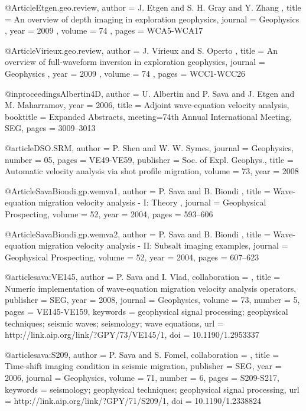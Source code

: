 {@Article{Etgen.geo.review,
 author =  { J. Etgen and  S. H. Gray and Y. Zhang },
 title =   { An overview of depth imaging in exploration geophysics},
 journal = { Geophysics },
 year =    { 2009 },
 volume =  { 74 },
 pages =   { WCA5-WCA17 }
}

@Article{Virieux.geo.review,
 author =  { J. Virieux and S. Operto },
 title =   { An overview of full-waveform inversion in exploration geophysics},
 journal = { Geophysics },
 year =    { 2009 },
 volume =  { 74 },
 pages =   { WCC1-WCC26 }
}


@inproceedings{Albertin4D,
  author = {U. Albertin and P. Sava and J. Etgen and M.
Maharramov},
  year = {2006},
  title = { Adjoint wave-equation velocity analysis},
  booktitle = {Expanded Abstracts},
  meeting={74th Annual International Meeting, SEG},
  pages = {3009--3013}
}

@article{DSO.SRM,
  author = {P. Shen and W. W. Symes},
  journal = {Geophysics},
  number = {05},
  pages = {VE49-VE59},
  publisher = {Soc. of Expl. Geophys.},
  title = {Automatic velocity analysis via shot profile migration},
  volume = {73},
  year = {2008}}


@Article{SavaBiondi.gp.wemva1,
 author =  { P. Sava and B. Biondi },
 title =   { Wave-equation migration velocity analysis - {I}: {Theory} },
 journal = {Geophysical Prospecting},
 volume = {52},
 year =   {2004},
 pages =  {593--606}
}

@Article{SavaBiondi.gp.wemva2,
 author =  { P. Sava and B. Biondi },
 title =   { Wave-equation migration velocity analysis - {II}:
{Subsalt} imaging examples},
 journal = {Geophysical Prospecting},
 volume = {52},
 year =   {2004},
 pages =  {607--623}
}




@article{sava:VE145,
author = {P. Sava and I. Vlad},
collaboration = {},
title = {Numeric implementation of wave-equation migration velocity analysis operators},
publisher = {SEG},
year = {2008},
journal = {Geophysics},
volume = {73},
number = {5},
pages = {VE145-VE159},
keywords = {geophysical signal processing; geophysical techniques; seismic waves; seismology; wave equations},
url = {http://link.aip.org/link/?GPY/73/VE145/1},
doi = {10.1190/1.2953337}
}




@article{sava:S209,
author = {P. Sava and S. Fomel},
collaboration = {},
title = {Time-shift imaging condition in seismic migration},
publisher = {SEG},
year = {2006},
journal = {Geophysics},
volume = {71},
number = {6},
pages = {S209-S217},
keywords = {seismology; geophysical techniques; geophysical signal processing},
url = {http://link.aip.org/link/?GPY/71/S209/1},
doi = {10.1190/1.2338824}
}



}
